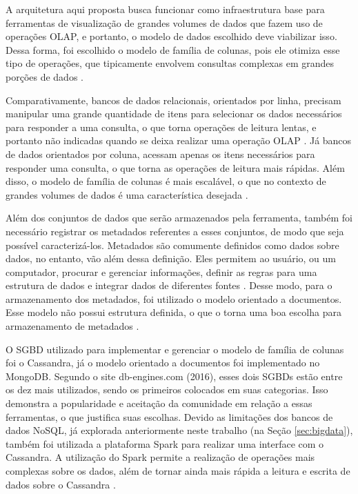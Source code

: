 A arquitetura aqui proposta busca funcionar como infraestrutura base para ferramentas de
visualização de grandes volumes de dados que fazem uso de operações OLAP, e portanto, 
o modelo de dados escolhido deve viabilizar isso. Dessa forma, foi escolhido o modelo de 
família de colunas, pois ele otimiza esse tipo de operações, que tipicamente envolvem
consultas complexas em grandes porções de dados \cite{sorjonen2012olap}. 

Comparativamente, bancos de dados relacionais, orientados por linha, precisam manipular uma 
grande quantidade de itens para selecionar os dados necessários para responder a uma consulta, 
o que torna operações de leitura lentas, e portanto não indicadas quando se deixa realizar 
uma operação OLAP \cite{sorjonen2012olap}. Já bancos de dados orientados por coluna, acessam 
apenas os itens necessários para responder uma consulta, o que torna as operações de leitura
mais rápidas. Além disso, o modelo de família de colunas é mais escalável, o que no contexto
de grandes volumes de dados é uma característica desejada \cite{moniruzzaman2013nosql}.

Além dos conjuntos de dados que serão armazenados pela ferramenta, também foi necessário 
registrar os metadados referentes a esses conjuntos, de modo que seja possível 
caracterizá-los. Metadados são comumente definidos como dados sobre dados, no entanto, vão 
além dessa definição. Eles permitem ao usuário, ou um computador, procurar e gerenciar 
informações, definir as regras para uma estrutura de dados e integrar dados de diferentes 
fontes \cite{turner2002metadata}. Desse modo, para o armazenamento dos metadados, foi 
utilizado o modelo orientado a documentos. Esse modelo não possui 
estrutura definida, o que o torna uma boa escolha para armazenamento de metadados 
\cite{de2010nosql}.

O SGBD utilizado para implementar e gerenciar o modelo de família de colunas foi o 
Cassandra, já o modelo orientado a documentos foi implementado no MongoDB. 
Segundo o site db-engines.com (2016), esses dois SGBDs estão entre os dez mais utilizados, 
sendo os primeiros colocados em suas categorias. Isso demonstra a popularidade e aceitação 
da comunidade em relação a essas ferramentas, o que justifica suas escolhas. Devido as 
limitações dos bancos de dados NoSQL, já explorada anteriormente neste trabalho 
(na Seção \ref{sec:bigdata}), também foi utilizada a plataforma Spark para realizar uma 
interface com o Cassandra. A utilização do Spark permite a realização de operações mais 
complexas sobre os dados, além de tornar ainda mais rápida a leitura e escrita de dados 
sobre o Cassandra \cite{kolaczkowski2014}.

